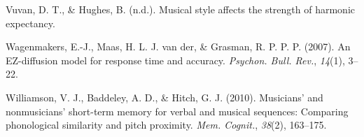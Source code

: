 \documentclass[english,man,floatsintext]{apa6}
\begin{document}
\leavevmode\hypertarget{ref-Vuvan_undated-zi}{}%
Vuvan, D. T., \& Hughes, B. (n.d.). Musical style affects the strength of harmonic expectancy.

\leavevmode\hypertarget{ref-Wagenmakers2007-qf}{}%
Wagenmakers, E.-J., Maas, H. L. J. van der, \& Grasman, R. P. P. P. (2007). An EZ-diffusion model for response time and accuracy. \emph{Psychon. Bull. Rev.}, \emph{14}(1), 3--22.

\leavevmode\hypertarget{ref-Williamson2010-dw}{}%
Williamson, V. J., Baddeley, A. D., \& Hitch, G. J. (2010). Musicians' and nonmusicians' short-term memory for verbal and musical sequences: Comparing phonological similarity and pitch proximity. \emph{Mem. Cognit.}, \emph{38}(2), 163--175.

\endgroup
\end{document}
